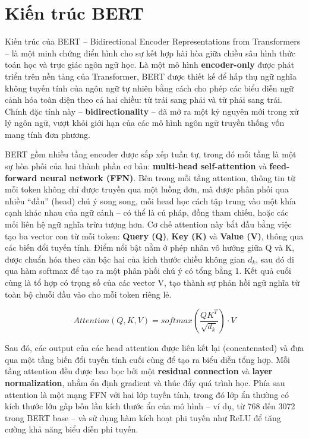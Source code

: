 \section{Kiến trúc BERT}
Kiến trúc của BERT \cite{devlin2019bertpretrainingdeepbidirectional} -- Bidirectional Encoder Representations from Transformers -- là một minh chứng điển hình cho sự kết hợp hài hòa giữa chiều sâu hình thức toán học và trực giác ngôn ngữ học. Là một mô hình \textbf{encoder-only} được phát triển trên nền tảng của Transformer, BERT được thiết kế để hấp thụ ngữ nghĩa không tuyến tính của ngôn ngữ tự nhiên bằng cách cho phép các biểu diễn ngữ cảnh hóa toàn diện theo cả hai chiều: từ trái sang phải và từ phải sang trái. Chính đặc tính này -- \textbf{bidirectionality} -- đã mở ra một kỷ nguyên mới trong xử lý ngôn ngữ, vượt khỏi giới hạn của các mô hình ngôn ngữ truyền thống vốn mang tính đơn phương.

BERT gồm nhiều tầng encoder được sắp xếp tuần tự, trong đó mỗi tầng là một sự hòa phối của hai thành phần cơ bản: \textbf{multi-head self-attention} và \textbf{feed-forward neural network (FFN)}. Bên trong mỗi tầng attention, thông tin từ mỗi token không chỉ được truyền qua một luồng đơn, mà được phân phối qua nhiều ``đầu'' (head) chú ý song song, mỗi head học cách tập trung vào một khía cạnh khác nhau của ngữ cảnh -- có thể là cú pháp, đồng tham chiếu, hoặc các mối liên hệ ngữ nghĩa trừu tượng hơn. Cơ chế attention này bắt đầu bằng việc tạo ba vector con từ mỗi token: \textbf{Query (Q)}, \textbf{Key (K)} và \textbf{Value (V)}, thông qua các biến đổi tuyến tính. Điểm nổi bật nằm ở phép nhân vô hướng giữa Q và K, được chuẩn hóa theo căn bậc hai của kích thước chiều không gian \(d_k\), sau đó đi qua hàm softmax để tạo ra một phân phối chú ý có tổng bằng 1. Kết quả cuối cùng là tổ hợp có trọng số của các vector V, tạo thành sự phản hồi ngữ nghĩa từ toàn bộ chuỗi đầu vào cho mỗi token riêng lẻ. \cite{vaswani2023attentionneed}

\begin{equation}
    Attention(Q, K, V) = softmax\left(\frac{QK^{T}}{\sqrt{d_{k}}}\right) \cdot V
\end{equation}

Sau đó, các output của các head attention được liên kết lại (concatenated) và đưa qua một tầng biến đổi tuyến tính cuối cùng để tạo ra biểu diễn tổng hợp. Mỗi tầng attention đều được bao bọc bởi một \textbf{residual connection} và \textbf{layer normalization}, nhằm ổn định gradient và thúc đẩy quá trình học. Phía sau attention là một mạng FFN với hai lớp tuyến tính, trong đó lớp ẩn thường có kích thước lớn gấp bốn lần kích thước ẩn của mô hình -- ví dụ, từ 768 đến 3072 trong BERT base -- và sử dụng hàm kích hoạt phi tuyến như ReLU để tăng cường khả năng biểu diễn phi tuyến.


